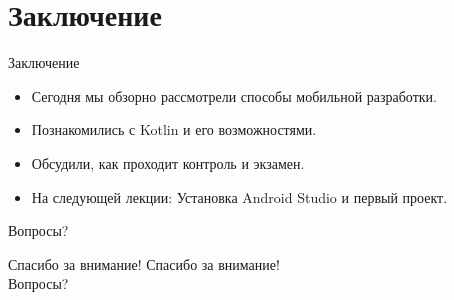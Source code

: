 \documentclass{beamer}
\begin{document}
\section{Заключение}

\begin{frame}{Заключение}
  \begin{itemize}
    \item Сегодня мы обзорно рассмотрели способы мобильной разработки.
    \item Познакомились с Kotlin и его возможностями.
    \item Обсудили, как проходит контроль и экзамен.
    \item На следующей лекции: Установка Android Studio и первый проект.
  \end{itemize}
  Вопросы?
\end{frame}

\begin{frame}{Спасибо за внимание!}
  \centering
  \Large{Спасибо за внимание!}\\
  \vspace{1cm}
  Вопросы?
\end{frame}
\end{document}
